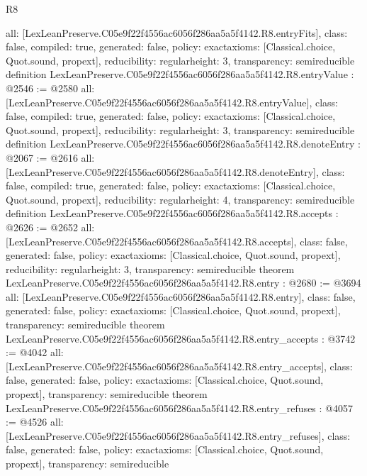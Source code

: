 \begin{lexlean}{R8}
\begin{coremodule}
{  all: [LexLeanPreserve.C05e9f22f4556ac6056f286aa5a5f4142.R8.entryFits],
  class: false,
  compiled: true,
  generated: false,
  policy: exact{axioms: [Classical.choice, Quot.sound, propext]},
  reducibility: regular{height: 3},
  transparency: semireducible
}
definition LexLeanPreserve.C05e9f22f4556ac6056f286aa5a5f4142.R8.entryValue : @2546 := @2580 {
  all: [LexLeanPreserve.C05e9f22f4556ac6056f286aa5a5f4142.R8.entryValue],
  class: false,
  compiled: true,
  generated: false,
  policy: exact{axioms: [Classical.choice, Quot.sound, propext]},
  reducibility: regular{height: 3},
  transparency: semireducible
}
definition LexLeanPreserve.C05e9f22f4556ac6056f286aa5a5f4142.R8.denoteEntry : @2067 := @2616 {
  all: [LexLeanPreserve.C05e9f22f4556ac6056f286aa5a5f4142.R8.denoteEntry],
  class: false,
  compiled: true,
  generated: false,
  policy: exact{axioms: [Classical.choice, Quot.sound, propext]},
  reducibility: regular{height: 4},
  transparency: semireducible
}
definition LexLeanPreserve.C05e9f22f4556ac6056f286aa5a5f4142.R8.accepts : @2626 := @2652 {
  all: [LexLeanPreserve.C05e9f22f4556ac6056f286aa5a5f4142.R8.accepts],
  class: false,
  generated: false,
  policy: exact{axioms: [Classical.choice, Quot.sound, propext]},
  reducibility: regular{height: 3},
  transparency: semireducible
}
theorem LexLeanPreserve.C05e9f22f4556ac6056f286aa5a5f4142.R8.entry : @2680 := @3694 {
  all: [LexLeanPreserve.C05e9f22f4556ac6056f286aa5a5f4142.R8.entry],
  class: false,
  generated: false,
  policy: exact{axioms: [Classical.choice, Quot.sound, propext]},
  transparency: semireducible
}
theorem LexLeanPreserve.C05e9f22f4556ac6056f286aa5a5f4142.R8.entry_accepts : @3742 := @4042 {
  all: [LexLeanPreserve.C05e9f22f4556ac6056f286aa5a5f4142.R8.entry_accepts],
  class: false,
  generated: false,
  policy: exact{axioms: [Classical.choice, Quot.sound, propext]},
  transparency: semireducible
}
theorem LexLeanPreserve.C05e9f22f4556ac6056f286aa5a5f4142.R8.entry_refuses : @4057 := @4526 {
  all: [LexLeanPreserve.C05e9f22f4556ac6056f286aa5a5f4142.R8.entry_refuses],
  class: false,
  generated: false,
  policy: exact{axioms: [Classical.choice, Quot.sound, propext]},
  transparency: semireducible
}


\end{coremodule}
\end{lexlean}
